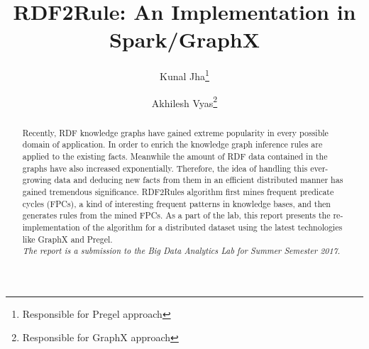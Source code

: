 \documentclass{easychair}
\begin{document}
%
\title{RDF2Rule: An Implementation in Spark/GraphX}



%
\author{
Kunal Jha\thanks{Responsible for Pregel approach}
\and
Akhilesh Vyas\thanks{Responsible for GraphX approach }\\
}




\clearpage

\maketitle

\begin{abstract}
 Recently, RDF knowledge graphs have gained extreme popularity in every possible domain of application. In order to enrich  the knowledge graph inference rules are applied to the existing facts. Meanwhile the amount of RDF data contained in the graphs have also increased exponentially. Therefore, the idea of handling this ever-growing data and deducing new facts from them in an efficient distributed manner has gained tremendous significance. RDF2Rules algorithm first mines frequent predicate cycles (FPCs), a kind of interesting frequent patterns in knowledge bases, and then generates rules from the mined FPCs. As a part of the lab, this report presents the  re-implementation of the algorithm for a distributed dataset using the latest technologies like GraphX and Pregel. \\
 
 
 \emph{The report is a submission to the Big Data Analytics Lab for Summer Semester 2017. }
\end{abstract}
\end{document}
